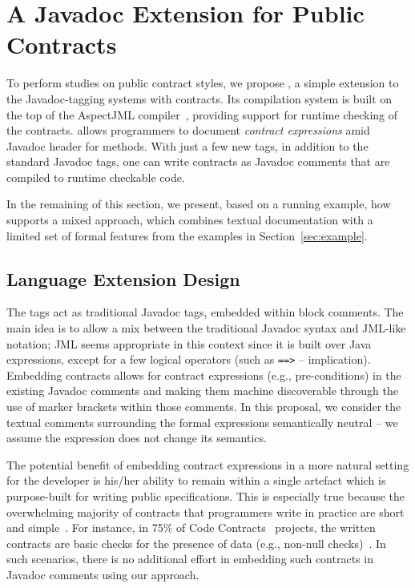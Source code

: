 \section{A Javadoc Extension for Public Contracts}
\label{sec:approach}

To perform studies on public contract styles, we propose \contractjdoc{}, a simple extension to the Javadoc-tagging systems with contracts. Its compilation system is built on the top of the AspectJML compiler~\cite{aspectjml}, providing support for runtime checking of the contracts.
\contractjdoc{} allows programmers to document \emph{contract expressions} amid Javadoc header for methods. With just a few new tags, in addition to the standard Javadoc tags, one can write contracts as Javadoc comments that are compiled to runtime checkable code. 

In the remaining of this section, we present, based on a running example, how \contractjdoc{} supports a mixed approach, which combines textual documentation with a limited set of formal features from the examples in Section~\ref{sec:example}.

\subsection{Language Extension Design}

The \contractjdoc{} tags act as traditional Javadoc tags,  embedded within block comments. 
The main idea is to allow a mix between the traditional Javadoc syntax and JML-like notation; 
JML seems appropriate in this context since it is built over Java expressions, except for a few logical operators (such as \texttt{==>} -- implication).
Embedding contracts allows for contract expressions (e.g., pre-conditions) in the existing Javadoc comments
and making them machine discoverable through the use of
marker brackets within those comments.
In this proposal, we consider the textual comments surrounding the formal expressions semantically neutral -- we assume the expression does not change its semantics. 

The potential benefit of embedding contract expressions in a more natural setting for the developer is his/her ability to remain within a single artefact which is purpose-built for writing public specifications. 
This is especially true because the overwhelming majority of contracts that programmers write in
practice are short and simple~\cite{Estler-etal14,typeContracts}. For instance, in 75\% of Code Contracts~\cite{codeContractsPaper} projects, the written contracts are basic checks for the presence of data (e.g., non-null checks)~\cite{typeContracts}. In such scenarios, there is no additional effort in embedding such contracts in Javadoc comments using our \contractjdoc{} approach.

